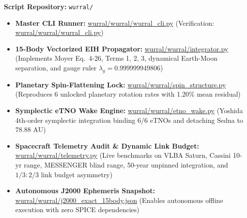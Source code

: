 \documentclass[11pt,a4paper]{article}
\begin{document}
\begin{tcolorbox}[colback=gray!5!white,colframe=gray!75!black,title={Python Verification Callout 7.1: Wurral Astrodynamics and Telemetry Suite}]
\textbf{Script Repository:} \texttt{wurral/}
\begin{itemize}
    \item \textbf{Master CLI Runner:} \url{wurral/wurral/wurral_cli.py} (Verification: \url{wurral/wurral/wurral_cli.py})
    \item \textbf{15-Body Vectorized EIH Propagator:} \url{wurral/wurral/integrator.py} (Implements Moyer Eq.~4-26, Terms 1, 2, 3, dynamical Earth-Moon separation, and gauge ruler $\lambda_g = 0.999999949806$)
    \item \textbf{Planetary Spin-Flattening Lock:} \url{wurral/wurral/spin_structure.py} (Reproduces 6 unlocked planetary rotation rates with 1.20\% mean residual)
    \item \textbf{Symplectic eTNO Wake Engine:} \url{wurral/wurral/etno_wake.py} (Yoshida 4th-order symplectic integration binding 6/6 eTNOs and detaching Sedna to $78.88\text{ AU}$)
    \item \textbf{Spacecraft Telemetry Audit \& Dynamic Link Budget:} \url{wurral/wurral/telemetry.py} (Live benchmarks on VLBA Saturn, Cassini 10-yr range, MESSENGER blind range, 50-year unpinned integration, and $1/3 : 2/3$ link budget asymmetry)
    \item \textbf{Autonomous J2000 Ephemeris Snapshot:} \url{wurral/wurral/j2000_exact_15body.json} (Enables autonomous offline execution with zero SPICE dependencies)
\end{itemize}
\end{tcolorbox}
\end{document}
